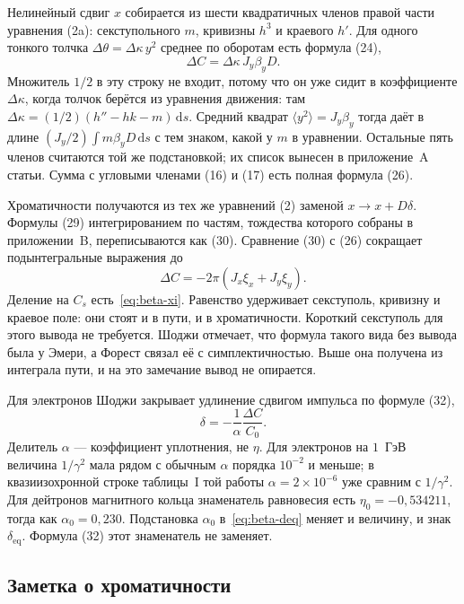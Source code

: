 Нелинейный сдвиг $x$ собирается из шести квадратичных членов правой части уравнения (2a): секступольного $m$, кривизны $h^3$ и краевого $h'$. Для одного тонкого толчка $\Delta\theta=\Delta\kappa\, y^2$ среднее по оборотам есть формула (24),
\begin{equation}
\label{eq:beta-shoji-24}
\Delta C=\Delta\kappa\, J_y\beta_y D.
\end{equation}
Множитель $1/2$ в эту строку не входит, потому что он уже сидит в коэффициенте $\Delta\kappa$, когда толчок берётся из уравнения движения: там $\Delta\kappa=(1/2)(h''-hk-m)\,\mathrm{d}s$. Средний квадрат $\langle y^2\rangle=J_y\beta_y$ тогда даёт в длине $(J_y/2)\int m\beta_y D\,\mathrm{d}s$ с тем знаком, какой у $m$ в уравнении. Остальные пять членов считаются той же подстановкой; их список вынесен в приложение~A статьи. Сумма с угловыми членами (16) и (17) есть полная формула (26).

Хроматичности получаются из тех же уравнений (2) заменой $x\to x+D\delta$. Формулы (29) интегрированием по частям, тождества которого собраны в приложении~B, переписываются как (30). Сравнение (30) с (26) сокращает подынтегральные выражения до
\begin{equation}
\label{eq:beta-shoji-31}
\Delta C=-2\pi(J_x\xi_x+J_y\xi_y).
\end{equation}
Деление на $C_s$ есть~\eqref{eq:beta-xi}. Равенство удерживает секступоль, кривизну и краевое поле: они стоят и в пути, и в хроматичности. Короткий секступоль для этого вывода не требуется. Шоджи отмечает, что формула такого вида без вывода была у Эмери, а Форест связал её с симплектичностью. Выше она получена из интеграла пути, и на это замечание вывод не опирается.

Для электронов Шоджи закрывает удлинение сдвигом импульса по формуле (32),
\begin{equation}
\label{eq:beta-shoji-32}
\delta=-\frac{1}{\alpha}\frac{\Delta C}{C_0}.
\end{equation}
Делитель $\alpha$ --- коэффициент уплотнения, не $\eta$. Для электронов на $1$~ГэВ величина $1/\gamma^2$ мала рядом с обычным $\alpha$ порядка $10^{-2}$ и меньше; в квазиизохронной строке таблицы~I той работы $\alpha=2\times 10^{-6}$ уже сравним с $1/\gamma^2$. Для дейтронов магнитного кольца знаменатель равновесия есть $\eta_0=-0{,}534211$, тогда как $\alpha_0=0{,}230$. Подстановка $\alpha_0$ в~\eqref{eq:beta-deq} меняет и величину, и знак $\delta_{\mathrm{eq}}$. Формула (32) этот знаменатель не заменяет.

\subsection{Заметка о хроматичности}
\label{sec:ch2-note}

